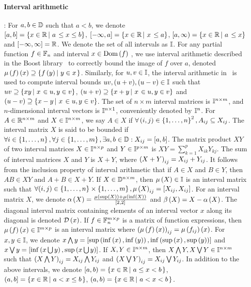 \paragraph{Interval arithmetic}:  For $a,b\in\mathbb{D}$ such that $a<b$, we
denote\\ $\left[a,b\right] = \left\{x\in\mathbb{R}\left|~a\right.\leq x\leq b\right\}$,
$[-\infty,a] = \left\{x\in\mathbb{R}\left|~x\right.\leq a\right\}$, $[a,\infty) =
  \left\{x\in\mathbb{R}\left|~a\right.\leq x\right\}$ and $[-\infty,\infty] = \mathbb{R}$.  We
  denote the set of all intervals as $\mathbb{I}$.  For any partial
  function $f\in \mathbb{F}_{n}$ and interval $x\in\operatorname{Dom}\left(f\right)$ , we use interval
  arithmetic described in the Boost library~\cite{todo} to correctly
  bound the image of $f$ over $a$, denoted $\mu\left(f\right)\left(x\right) \supseteq
  \left\{f\left(y\right)\left|~y\in x\right. \right\}$. 
  Similarly, for $u,v\in\mathbb{I}$, the
  interval arithmetic in~\cite{todo} is used to compute interval
  bounds $uv,(u+v),(u-v)\in\mathbb{I}$ such that
  $uv\supseteq\left\{xy\left|~x\right.\in u, y\in v\right\}$,
  $\left(u+v\right)\supseteq\left\{x+y\left|~x\right.\in u, y\in v\right\}$ and
  $\left(u-v\right)\supseteq\left\{x-y\left|~x\right.\in u, y\in v\right\}$.
%
The set of $n\times m$ interval matrices is $\mathbb{I}^{n\times m}$,
and $n$-dimensional interval vectors is $\mathbb{I}^{n\times 1}$,
conveniently denoted by $\mathbb{I}^{n}$.  For $A\in\mathbb{R}^{n\times m}$
and $X\in\mathbb{I}^{n\times m}$, we say $A\in X$ if $\forall
\left(i,j\right)\in\left\{1,\ldots,n\right\}^2, A_{ij}\subseteq X_{ij}$.  The interval
matrix $X$ is said to be bounded if $\forall
i\in\left\{1,\ldots,n\right\}, \forall j\in\left\{1,\ldots,m\right\}, \exists
a,b\in\mathbb{D}: X_{ij} = [a,b]$.  The matrix product $XY$ of two
interval matrices $X\in\mathbb{I}^{n\times p}$ and
$Y\in\mathbb{I}^{p\times m}$ is $XY = \sum_{k=1}^pX_{ik}Y_{kj}$. The
sum of interval matrices $X$ and $Y$ is $X + Y$, where $\left(X+Y\right)_{ij} = X_{ij} +
Y_{ij}$.  It follows from the inclusion property of interval
arithmetic that if $A\in X$ and $B\in Y$, then $AB\in XY$ and $A+B\in
X+Y$.  If $X\in\mathbb{D}^{n\times m}$, then $\mu\left(X\right)\in\mathbb{I}$ is
an interval matrix such that $\forall
(i,j)\in\left\{1,\ldots,n\right\}\times\left\{1,\ldots,m\right\}, \mu\left(X\right)_{ij} =
[X_{ij},X_{ij}]$.  For an interval matrix $X$, we denote $\alpha\left(X\right) =
\frac{\mu\left(\sup\left(X\right)\right) + \mu\left(\inf\left(X\right)\right)}{[2,2]}$ and $\beta\left(X\right) =
X - \alpha\left(X\right)$.  The diagonal interval matrix containing elements of an
interval vector $x$  along its diagonal is denoted $\mathcal{D}\left(x\right)$.  If
$f\in\mathbb{F}_{n}^{m\times p}$ is a matrix of function expressions, then
$\mu\left(f\right)\left(x\right)\in \mathbb{I}^{m\times p}$ is an interval matrix where
$\left(\mu\left(f\right)\left(x\right)\right)_{ij} = \mu\left(f_{ij}\right)\left(x\right)$.  For $x,y\in\mathbb{I}$, we
denote $x\bigwedge y =
[\sup\left(\inf\left(x\right),\inf\left(y\right)\right),\inf\left(\sup\left(x\right),\sup\left(y\right)\right)]$ and
$x\bigvee y = [\inf\left(x\bigcup y\right), \sup\left(x\bigcup y\right)]$.  If
$X,Y\in\mathbb{I}^{n\times m}$, then
$X\bigwedge Y,X\bigvee Y\in\mathbb{I}^{n\times m}$ such that
$\left(X\bigwedge Y\right)_{ij} = X_{ij}\bigwedge Y_{ij}$ and
$\left(X\bigvee Y\right)_{ij} = X_{ij}\bigvee Y_{ij}$.
%
In addition to the above intervals, we denote
%
$[a,b) = \left\{x\in\mathbb{R}\left|~a\leq x<b\right.\right\}$, $(a,b] = \left\{x\in\mathbb{R}\left|~a< x\leq b\right.\right\}$, $(a,b) = \left\{x\in\mathbb{R}\left|~a< x < b\right.\right\}$.


